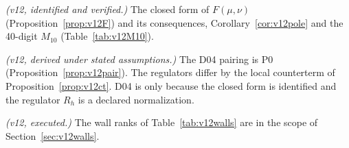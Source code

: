 \item \emph{(v12, identified and verified.)} The closed form of
\(F(\mu,\nu)\) (Proposition~\ref{prop:v12F}) and its consequences,
Corollary~\ref{cor:v12pole} and the 40-digit \(M_{10}\)
(Table~\ref{tab:v12M10}).

\item \emph{(v12, derived under stated assumptions.)} The D04
pairing is P0 (Proposition~\ref{prop:v12pair}). The regulators differ
by the local counterterm of Proposition~\ref{prop:v12ct}. D04 is
\PARTIAL{} only because the closed form is identified and the
regulator \(R_h\) is a declared normalization.

\item \emph{(v12, executed.)} The wall ranks of
Table~\ref{tab:v12walls} are \CPIR{} in the scope of
Section~\ref{sec:v12walls}.
